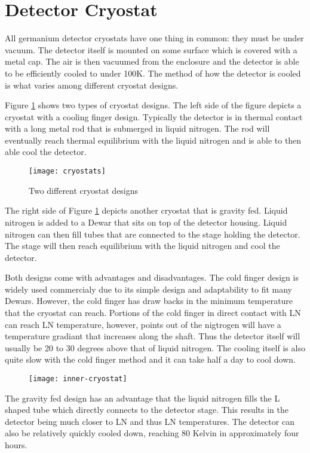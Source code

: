 \section{Detector Cryostat}
All germanium detector cryostats have one thing in common: they must be under vacuum.
The detector itself is mounted on some surface which is covered with a metal cap.
The air is then vacuumed from the enclosure and the detector is able to be efficiently cooled to under 100K.
The method of how the detector is cooled is what varies among different cryostat designs.

Figure \ref{fig:cryostats} shows two types of cryostat designs.
The left side of the figure depicts a cryostat with a cooling finger design.
Typically the detector is in thermal contact with a long metal rod that is submerged in liquid nitrogen.
The rod will eventually reach thermal equilibrium with the liquid nitrogen and is able to then able cool the detector.
\begin{figure}[htpb]
\centering
\texttt{[image: cryostats]}
\caption{Two different cryostat designs}
\label{fig:cryostats}
\end{figure}
The right side of Figure \ref{fig:cryostats} depicts another cryostat that is gravity fed.
Liquid nitrogen is added to a Dewar that sits on top of the detector housing.
Liquid nitrogen can then fill tubes that are connected to the stage holding the detector.
The stage will then reach equilibrium with the liquid nitrogen and cool the detector.

Both designs come with advantages and disadvantages.
The cold finger design is widely used commercialy due to its simple design and adaptability to fit many Dewars.
However, the cold finger has draw backs in the minimum temperature that the cryostat can reach.
Portions of the cold finger in direct contact with LN can reach LN temperature, however, points out of the nigtrogen will have a temperature gradiant that increases along the shaft.
Thus the detector itself will usually be 20 to 30 degrees above that of liquid nitrogen.
The cooling itself is also quite slow with the cold finger method and it can take half a day to cool down.
\begin{figure}[htpb]
\centering
\texttt{[image: inner-cryostat]}
\caption{}
\label{fig:inner-cryostat}
\end{figure}
The gravity fed design has an advantage that the liquid nitrogen fills the L shaped tube which directly connects to the detector stage.
This results in the detector being much closer to LN  and thus LN temperatures.
The detector can also be relatively quickly cooled down, reaching 80 Kelvin in approximately four hours.

